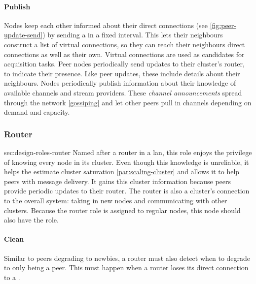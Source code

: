 \paragraph{Publish}\label{par:design-roles-peer-publish}
\begin{itemize}
     Nodes keep each other informed about their direct connections (see \vref{fig:peer-update-send}) by sending a \peerUpdate in a fixed interval. This lets their neighbours construct a list of virtual connections, so they can reach their neighbours direct connections as well as their own. Virtual connections are used as candidates for acquisition tasks.
     Peer nodes periodically send updates to their cluster's router, to indicate their presence. Like peer updates, these include details about their neighbours.
    \label{item:peer-publish-channel-announcement} Nodes periodically publish information about their knowledge of available channels and stream providers. These \textit{channel announcements} spread through the network \ref{gossiping} and let other peers pull in channels depending on demand and capacity.
\end{itemize}

\subsubsection{Router}{sec:design-roles-router}
Named after a router in a \gls{lan}, this role enjoys the privilege of knowing every node in its cluster. Even though this knowledge is unreliable, it helps the \routerRole estimate cluster saturation \cref{par:scaling-cluster} and allows it to help peers with message delivery. It gains this cluster information because peers provide periodic updates to their router. The router is also a cluster's connection to the overall system: taking in new nodes and communicating with other clusters. Because the router role is assigned to regular nodes, this node should also have the \peerRole role.

\paragraph{Clean}
\begin{itemize}
     Similar to peers degrading to newbies, a router must also detect when to degrade to only being a peer. This must happen when a router loses its direct connection to a \signalRole.
\end{itemize}

